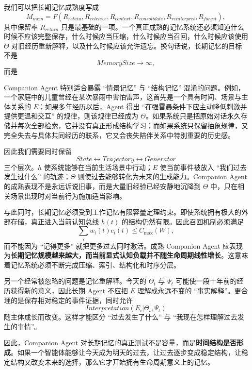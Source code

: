 我们可以把长期记忆成熟度写成
\[
M_{mem}
=
F
\left(
R_{retain},
R_{retrieve},
R_{context},
R_{consolidate},
R_{reinterpret},
R_{forget}
\right),
\]
其中保留率 $R_{retain}$ 只是最基础的一项。一个真正成熟的记忆系统还必须知道什么时候不应该完整保存，什么时候应当压缩，什么时候应当召回，什么时候应该使用 $\Theta$ 对旧经历重新解释，以及什么时候应该允许遗忘。换句话说，长期记忆的目标不是
\[
MemorySize\rightarrow\infty,
\]
而是
\begin{statementbox}
\centering
{}
\end{statementbox}

Companion Agent 特别适合暴露 ``情景记忆'' 与 ``结构记忆'' 混淆的问题。例如，一个家庭中的儿童曾经在某次暴雨中害怕雷声，这首先是一个具有时间、场景与主体关系的 $E$；如果多年经历以后，Agent 得出 ``在强雷暴条件下应主动降低刺激并提供更温和交互'' 的规律，则该规律已经成为 $\Theta$。如果系统只是把原始对话永久存储并每次全部检索，它并没有真正形成结构学习；而如果系统只保留抽象规律，又完全失去与具体共同经历的联系，它又会丧失陪伴关系中特别重要的历史感。

因此我们需要同时保留
\[
State
\leftrightarrow
Trajectory
\leftrightarrow
Generator
\]
三个层次。$h$ 使系统能够在当前生活场景中行动；$E$ 使当前事件被放入 ``我们过去发生过什么'' 的轨迹；$\Theta$ 则使过去能够转化为未来的生成能力。Companion Agent 的成熟表现不是永远诉说旧事，而是大量旧经验已经安静地沉降到 $\Theta$ 中，只在相关场景出现时对当前行为施加适当影响。

与此同时，长期记忆必须受到工作记忆有限容量定理约束。即使系统拥有极大的外部存储，真正进入当前认知总线 $h(t)$ 的结构仍然有限。因此召回机制必须满足
\[
\sum_i
w_i(t)c_i(t)
\leq
C_{\max}(W),
\]
而不能因为 ``记得更多'' 就把更多过去同时激活。成熟 Companion Agent 应表现为\textbf{长期记忆规模越来越大，而当前显式认知负载并不随生命周期线性增长}。这意味着记忆系统必须不断完成压缩、索引、结构化和时序分层。

另一个经常被忽略的问题是记忆重解释。今天的 $\Theta_t$ 与 $\Psi_t$ 可能使一段十年前的经历获得新的意义，因此长期 Agent 不应把 $E$ 理解成永远不变的 ``事实解释''。更合理的是保存相对稳定的事件证据，同时允许
\[
Interpretation(E_i|\Theta_t,\Psi_t)
\]
随主体成长而改变。这样才能区分 ``过去发生了什么'' 与 ``我现在怎样理解过去发生的事情''。

因此，Companion Agent 对长期记忆的真正测试不是容量，而是\textbf{时间结构是否形成}。如果一个智能体能够让今天成为明天的过去，让过去逐步变成稳定结构，让稳定结构又改变未来的选择，那么它才开始拥有生命周期意义上的记忆。

